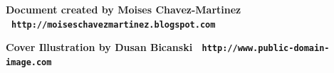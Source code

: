 \documentclass[11pt,twoside,openany,x11names,svgnames]{memoir}
\begin{document}

\begin{center}

\vspace*{\baselineskip}

\textbf{\textcolor{LightGoldenrod!50!Gold}{Document created by Moises Chavez-Martinez \textbullet\ \texttt{http://moiseschavezmartinez.blogspot.com}}}

\vspace*{\baselineskip}

\textbf{\textcolor{LightGoldenrod}{Cover Illustration by Dusan Bicanski \textbullet\ \texttt{http://www.public-domain-image.com}}}
\end{center}
\end{document}
